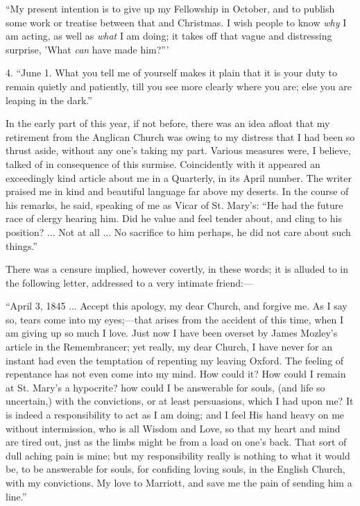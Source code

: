 ``My present intention is to give up my Fellowship in October,
and to publish some work or treatise between that and Christmas. I wish
people to know \emph{why} I am acting, as well as \emph{what} I am
doing; it takes off that vague and distressing surprise, 'What \emph{can}
have made him?'''

4. ``June 1. What you tell me of yourself makes it
plain that it is your duty to remain quietly and patiently, till you see
more clearly where you are; else you are leaping in the dark.''

In the early part of this year, if not before, there was an idea
afloat that my retirement from the Anglican Church was owing to my
distress that I had been so thrust aside, without any one's taking my
part. Various measures were, I believe, talked of in consequence of this
surmise. Coincidently with it appeared an exceedingly kind article
about me in a Quarterly, in its April number. The writer praised me in
kind and beautiful language far above my deserts. In the course of
his remarks, he said, speaking of me as Vicar of St. Mary's: ``He
had the future race of clergy hearing him. Did he value and feel tender
about, and cling to his position? ... Not at all ... No sacrifice to him
perhaps, he did not care about such things.''

There was a censure implied, however covertly, in these words; it is alluded to in
the following letter, addressed to a very intimate
friend:—

``April 3, 1845 ... Accept this apology, my dear Church,
and forgive me. As I say so, tears come into my eyes;—that arises from
the accident of this time, when I am giving up so much I love. Just now
I have been overset by James Mozley's article in the Remembrancer; yet really, my dear Church, I have never for an instant
had even the temptation of repenting my leaving Oxford. The feeling of
repentance has not even come into my mind. How could it? How could I
remain at St. Mary's a hypocrite? how could I be answerable for
souls, (and life so uncertain,) with the convictions, or at least
persuasions, which I had upon me? It is indeed a responsibility to act
as I am doing; and I feel His hand heavy on me without intermission, who
is all Wisdom and Love, so that my heart and mind are tired out, just as
the limbs might be from a load on one's back. That sort of dull aching
pain is mine; but my responsibility really is nothing to what it would
be, to be answerable for souls, for confiding loving souls, in the
English Church, with my convictions. My love to Marriott, and save me
the pain of sending him a line.''

